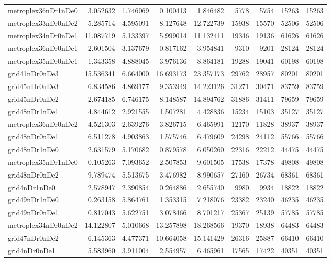 \begin{longtable}{|l|r|r|r|r|r|r|r|r|}
metroplex36nDr1nDe0 & 3.052632 & 1.746069 & 0.100413 & 1.846482 & 5778 & 5754 & 15263 & 15263 \\
metroplex33nDr0nDe2 & 5.285714 & 4.595091 & 8.127648 & 12.722739 & 15938 & 15570 & 52506 & 52506 \\
metroplex34nDr0nDe1 & 11.087719 & 5.133397 & 5.999014 & 11.132411 & 19346 & 19136 & 61626 & 61626 \\
metroplex36nDr0nDe1 & 2.601504 & 3.137679 & 0.817162 & 3.954841 & 9310 & 9201 & 28124 & 28124 \\
metroplex35nDr0nDe1 & 1.343358 & 4.888045 & 3.976136 & 8.864181 & 19288 & 19041 & 60198 & 60198 \\
grid41nDr0nDe3 & 15.536341 & 6.664000 & 16.693173 & 23.357173 & 29762 & 28957 & 80201 & 80201 \\
grid45nDr0nDe3 & 6.834586 & 4.869177 & 9.353949 & 14.223126 & 31271 & 30471 & 83759 & 83759 \\
grid45nDr0nDe2 & 2.674185 & 6.746175 & 8.148587 & 14.894762 & 31886 & 31411 & 79659 & 79659 \\
grid48nDr1nDe1 & 4.844612 & 2.921555 & 1.507281 & 4.428836 & 15234 & 15103 & 35127 & 35127 \\
metroplex36nDr0nDe2 & 4.521303 & 2.639276 & 3.826715 & 6.465991 & 12170 & 11828 & 38937 & 38937 \\
grid48nDr0nDe1 & 6.511278 & 4.903863 & 1.575746 & 6.479609 & 24298 & 24112 & 55766 & 55766 \\
grid48nDr1nDe0 & 2.631579 & 5.170682 & 0.879578 & 6.050260 & 22316 & 22212 & 44475 & 44475 \\
metroplex35nDr1nDe0 & 0.105263 & 7.093652 & 2.507853 & 9.601505 & 17538 & 17378 & 49808 & 49808 \\
grid48nDr0nDe2 & 9.789474 & 5.513675 & 3.476982 & 8.990657 & 27160 & 26734 & 68361 & 68361 \\
grid4nDr1nDe0 & 2.578947 & 2.390854 & 0.264886 & 2.655740 & 9980 & 9934 & 18822 & 18822 \\
grid49nDr1nDe0 & 0.263158 & 5.864761 & 1.353315 & 7.218076 & 23382 & 23240 & 46235 & 46235 \\
grid49nDr0nDe1 & 0.817043 & 5.622751 & 3.078466 & 8.701217 & 25367 & 25139 & 57785 & 57785 \\
metroplex34nDr0nDe2 & 14.122807 & 5.010668 & 13.257898 & 18.268566 & 19370 & 18938 & 64483 & 64483 \\
grid47nDr0nDe2 & 6.145363 & 4.477371 & 10.664058 & 15.141429 & 26316 & 25887 & 66410 & 66410 \\
grid4nDr0nDe1 & 5.583960 & 3.911004 & 2.554957 & 6.465961 & 17565 & 17422 & 40351 & 40351 \\

\end{longtable}
